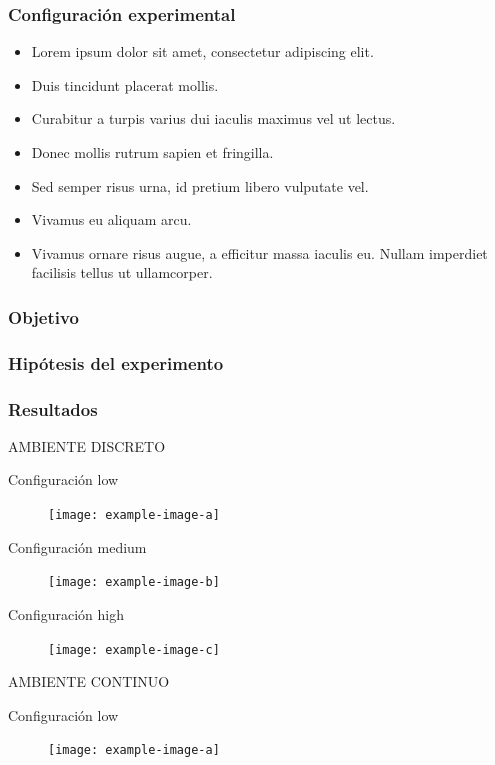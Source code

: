 \subsubsection{Configuración experimental}

\begin{itemize}
    \item  Lorem ipsum dolor sit amet, consectetur adipiscing elit. 
    \item Duis tincidunt placerat mollis. 
    \item Curabitur a turpis varius dui iaculis maximus vel ut lectus. 
    \item Donec mollis rutrum sapien et fringilla.
    \item Sed semper risus urna, id pretium libero vulputate vel. 
    \item Vivamus eu aliquam arcu. 
    \item Vivamus ornare risus augue, a efficitur massa iaculis eu. Nullam imperdiet facilisis tellus ut ullamcorper. 
\end{itemize}
\subsubsection{Objetivo}
\subsubsection{Hipótesis del experimento}
\subsubsection{Resultados}

AMBIENTE DISCRETO

Configuración low
\begin{figure}[H]
    \centering
    \texttt{[image: example-image-a]}
\end{figure}


Configuración medium
\begin{figure}[H]
    \centering
    \texttt{[image: example-image-b]}
\end{figure}

Configuración high
\begin{figure}[H]
    \centering
    \texttt{[image: example-image-c]}
\end{figure}



AMBIENTE CONTINUO

Configuración low
\begin{figure}[H]
    \centering
    \texttt{[image: example-image-a]}
\end{figure}


